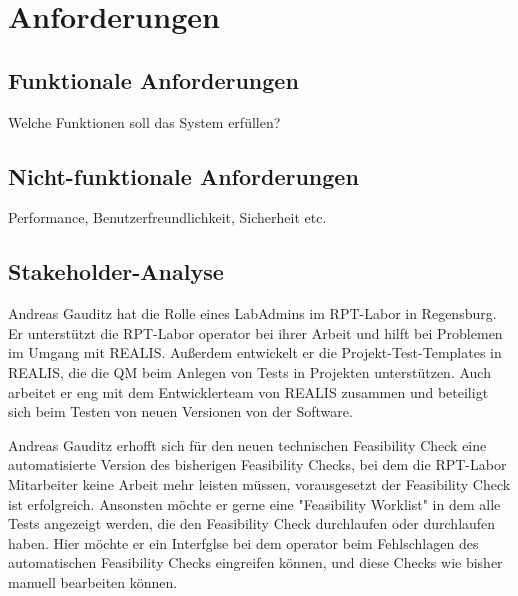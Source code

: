 \chapter{Anforderungen}\label{Chap:Anforderungen}

\section{Funktionale Anforderungen}
Welche Funktionen soll das System erfüllen?
\section{Nicht-funktionale Anforderungen}
Performance, Benutzerfreundlichkeit, Sicherheit etc.

\section{Stakeholder-Analyse}
Andreas Gauditz hat die Rolle eines LabAdmins im \gls{RPT}-Labor in Regensburg. Er unterstützt die \gls{RPT}-Labor \gls{operator} bei ihrer Arbeit und hilft bei Problemen im Umgang mit \gls{REALIS}. Außerdem entwickelt er die Projekt-Test-Templates in \gls{REALIS}, die die \gls{QM} beim Anlegen von Tests in Projekten unterstützen.
Auch arbeitet er eng mit dem Entwicklerteam von \gls{REALIS} zusammen und beteiligt sich beim Testen von neuen Versionen von der Software.

Andreas Gauditz erhofft sich für den neuen technischen Feasibility Check eine automatisierte Version des bisherigen Feasibility Checks, bei dem die \gls{RPT}-Labor Mitarbeiter keine Arbeit mehr leisten müssen, vorausgesetzt der Feasibility Check ist erfolgreich. Ansonsten möchte er gerne eine "Feasibility Worklist" in dem alle Tests angezeigt werden, die den Feasibility Check durchlaufen oder durchlaufen haben. Hier möchte er ein Interfglse bei dem \gls{operator} beim Fehlschlagen des automatischen Feasibility Checks eingreifen können, und diese Checks wie bisher manuell bearbeiten können.
